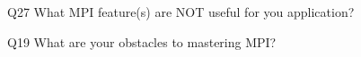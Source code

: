 \begin{description}%
\item{Q27} What MPI feature(s) are NOT useful for you application?%
\item{Q19} What are your obstacles to mastering MPI?%
\end{description}%
